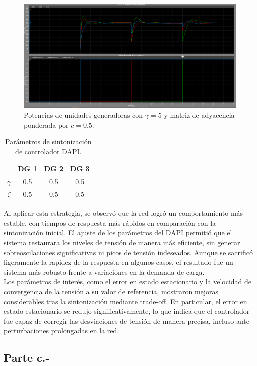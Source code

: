 \begin{figure}
    \centering
    \includegraphics[width=0.5\linewidth]{Tarea 2/report/imagenes/p2b/voltaje-compartido.png}
    \caption{Potencias de unidades generadoras con $\gamma = 5$ y matriz de adyacencia ponderada por $c = 0.5$.}
    \label{voltaje-compartido}
\end{figure}


\begin{table}[h!]
\centering
\begin{tabular}{|c|c|c|c|}
\hline
 & DG 1 & DG 2 & DG 3 \\ 
\hline
$\gamma$ & 0.5 & 0.5 & 0.5 \\ 
\hline
$\zeta$  & 0.5 & 0.5 & 0.5 \\ 
\hline
\end{tabular}
\caption{Parámetros de sintonización de controlador DAPI.}
\label{parametros_dapi}
\end{table}


Al aplicar esta estrategia, se observó que la red logró un comportamiento más estable, con tiempos de respuesta más rápidos en comparación con la sintonización inicial. El ajuste de los parámetros del DAPI permitió que el sistema restaurara los niveles de tensión de manera más eficiente, sin generar sobreoscilaciones significativas ni picos de tensión indeseados. Aunque se sacrificó ligeramente la rapidez de la respuesta en algunos casos, el resultado fue un sistema más robusto frente a variaciones en la demanda de carga.\\

Los parámetros de interés, como el error en estado estacionario y la velocidad de convergencia de la tensión a su valor de referencia, mostraron mejoras considerables tras la sintonización mediante trade-off. En particular, el error en estado estacionario se redujo significativamente, lo que indica que el controlador fue capaz de corregir las desviaciones de tensión de manera precisa, incluso ante perturbaciones prolongadas en la red.

\subsection{Parte c.-}

